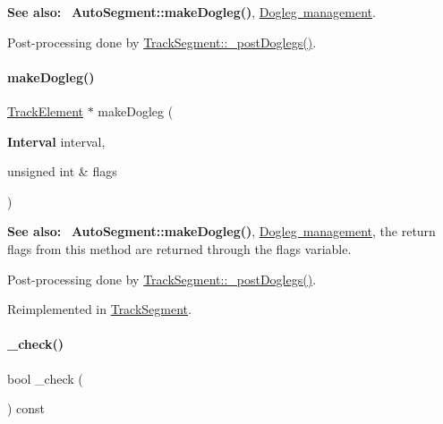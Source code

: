 {\bfseries See also\+:}~ \textbf{ Auto\+Segment\+::make\+Dogleg()}, \mbox{\hyperlink{classKite_1_1TrackSegment_secDogleg}{Dogleg management}}.

Post-\/processing done by \mbox{\hyperlink{classKite_1_1TrackSegment_a10a45c049d0bd7d01c7eff1c5441c7a2}{Track\+Segment\+::\+\_\+post\+Doglegs()}}. \mbox{\label{classKite_1_1TrackElement_a524f1569b2f2c1a84df2fe47e84e28ed}} 
\paragraph{\texorpdfstring{make\+Dogleg()}{makeDogleg()}\hspace{0.1cm}{\footnotesize\ttfamily [3/3]}}
{\footnotesize\ttfamily \mbox{\hyperlink{classKite_1_1TrackElement}{Track\+Element}} $\ast$ make\+Dogleg (\begin{DoxyParamCaption}\item[{\textbf{ Interval}}]{interval,  }\item[{unsigned int \&}]{flags }\end{DoxyParamCaption})\hspace{0.3cm}{\ttfamily [virtual]}}

{\bfseries See also\+:}~ \textbf{ Auto\+Segment\+::make\+Dogleg()}, \mbox{\hyperlink{classKite_1_1TrackSegment_secDogleg}{Dogleg management}}, the return flags from this method are returned through the {\ttfamily flags} variable.

Post-\/processing done by \mbox{\hyperlink{classKite_1_1TrackSegment_a10a45c049d0bd7d01c7eff1c5441c7a2}{Track\+Segment\+::\+\_\+post\+Doglegs()}}. 

Reimplemented in \mbox{\hyperlink{classKite_1_1TrackSegment_a524f1569b2f2c1a84df2fe47e84e28ed}{Track\+Segment}}.

\mbox{\label{classKite_1_1TrackElement_ad79f4c6ea0fe1135b8264a29af085909}} 
\paragraph{\texorpdfstring{\+\_\+check()}{\_check()}}
{\footnotesize\ttfamily bool \+\_\+check (\begin{DoxyParamCaption}{ }\end{DoxyParamCaption}) const\hspace{0.3cm}{\ttfamily [virtual]}}

